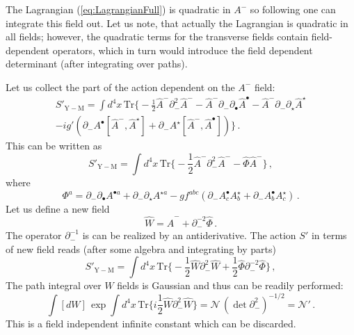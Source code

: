 \documentclass[english,american]{article}
\begin{document}
The Lagrangian (\ref{eq:LagrangianFull}) is quadratic in $A^{-}$
so following \citep{Scherk1975,Mansfield2006} one can integrate this
field out. Let us note, that actually the Lagrangian is quadratic
in all fields; however, the quadratic terms for the transverse fields
contain field-dependent operators, which in turn would introduce the
field dependent determinant (after integrating over paths).

Let us collect the part of the action dependent on the $A^{-}$ field:
\begin{multline}
S'_{\mathrm{Y-M}}=\int d^{4}x\,\mathrm{Tr}\Bigg\{-\frac{1}{2}\hat{A}^{-}\partial_{-}^{2}\hat{A}^{-}-\hat{A}^{-}\partial_{-}\partial_{\bullet}\hat{A}^{\bullet}-\hat{A}^{-}\partial_{-}\partial_{\star}\hat{A}^{\star}\\
-ig'\left(\partial_{-}A^{\bullet}\left[\hat{A}^{-},\hat{A}^{\star}\right]+\partial_{-}A^{\star}\left[\hat{A}^{-},\hat{A}^{\bullet}\right]\right)\Bigg\}\,.
\end{multline}
This can be written as
\begin{equation}
S'_{\mathrm{Y-M}}=\int d^{4}x\,\mathrm{Tr}\Bigg\{-\frac{1}{2}\hat{A}^{-}\partial_{-}^{2}\hat{A}^{-}-\hat{\Phi}\hat{A}^{-}\Bigg\}\,,
\end{equation}
where
\begin{equation}
\Phi^{a}=\partial_{-}\partial_{\bullet}A^{\bullet a}+\partial_{-}\partial_{\star}A^{\star a}-gf^{abc}\left(\partial_{-}A_{c}^{\bullet}A_{b}^{\star}+\partial_{-}A_{b}^{\bullet}A_{c}^{\star}\right)\,.
\end{equation}
Let us define a new field
\begin{equation}
\hat{W}=\hat{A}^{-}+\partial_{-}^{-2}\hat{\Phi}\,.
\end{equation}
The operator $\partial_{-}^{-1}$ is can be realized by an antiderivative.
The action $S'$ in terms of new field reads (after some algebra and
integrating by parts)
\begin{equation}
S'_{\mathrm{Y-M}}=\int d^{4}x\,\mathrm{Tr}\Bigg\{-\frac{1}{2}\hat{W}\partial_{-}^{2}\hat{W}+\frac{1}{2}\hat{\Phi}\partial_{-}^{-2}\hat{\Phi}\Bigg\}\,,
\end{equation}
The path integral over $W$ fields is Gaussian and thus can be readily
performed:
\begin{equation}
\int\left[dW\right]\,\exp\int d^{4}x\,\mathrm{Tr}\Bigg\{ i\frac{1}{2}\hat{W}\partial_{-}^{2}\hat{W}\Bigg\}=\mathcal{N}\,\left(\det\partial_{-}^{2}\right)^{-1/2}=\mathcal{N}'\,.
\end{equation}
This is a field independent infinite constant which can be discarded.
\end{document}
